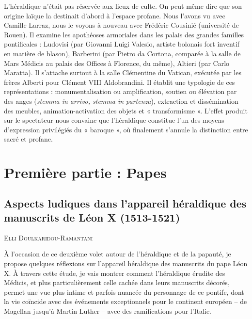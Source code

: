 \documentclass[12pt,twoside,openany]{book}
\newcommand{\PurhContributors}[1]{%
  \par\vspace{0.5\baselineskip}%
  {\normalsize\scshape #1\par}%
  \vspace{0.6\baselineskip}%
}
\begin{document}
L’héraldique n’était pas réservée aux lieux de culte. On peut même dire que son origine laïque la destinait d’abord à l’espace profane. Nous l’avons vu avec Camille Larraz, nous le voyons à nouveau avec Frédéric Cousinié (université de Rouen). Il examine les apothéoses armoriales dans les palais des grandes familles pontificales : Ludovisi (par Giovanni Luigi Valesio, artiste bolonais fort inventif en matière de blason), Barberini (par Pietro da Cortona, comparée à la salle de Mars Médicis au palais des Offices à Florence, du même), Altieri (par Carlo Maratta). Il s’attache surtout à la salle Clémentine du Vatican, exécutée par les frères Alberti pour Clément VIII Aldobrandini. Il établit une typologie de ces représentations : monumentalisation ou amplification, soutien ou élévation par des anges (\textit{stemma in arrivo, stemma in partenza}), extraction et dissémination des meubles, animation-activation des objets et « transformisme ». L’effet produit sur le spectateur nous convainc que l’héraldique constitue l’un des moyens d’expression privilégiés du « baroque », où finalement s’annule la distinction entre sacré et profane.

\part*{Première partie : Papes}

\chapter{Aspects ludiques dans l’appareil héraldique des manuscrits de Léon X (1513-1521)}

\PurhContributors{Elli Doulkaridou-Ramantani}

À l’occasion de ce deuxième volet autour de l’héraldique et de la papauté, je propose quelques réflexions sur l’appareil héraldique des manuscrits du pape Léon X. À travers cette étude, je vais montrer comment l’héraldique érudite des Médicis, et plus particulièrement celle cachée dans leurs manuscrits décorés, permet une vue plus intime et parfois nuancée du personnage de ce pontife, dont la vie coïncide avec des événements exceptionnels pour le continent européen – de Magellan jusqu’à Martin Luther – avec des ramifications pour l’Italie.
\end{document}
